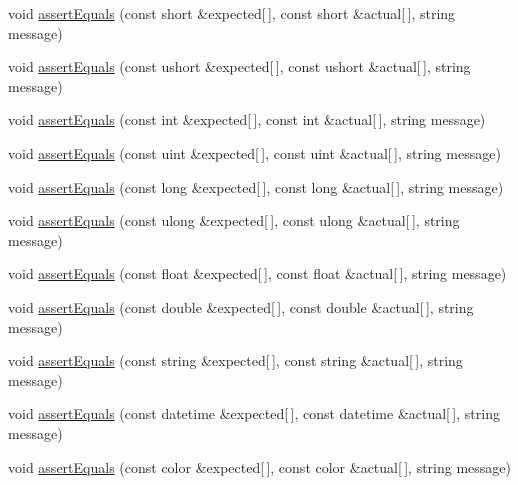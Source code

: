 \begin{DoxyCompactItemize}
\item 
void \mbox{\hyperlink{class_unit_test_ad7afd8e2f1a6b35eabf2671285776d7c}{assert\+Equals}} (const short \&expected\mbox{[}$\,$\mbox{]}, const short \&actual\mbox{[}$\,$\mbox{]}, string message)
\item 
void \mbox{\hyperlink{class_unit_test_a341a195925544c6cd97456fed137c6ee}{assert\+Equals}} (const ushort \&expected\mbox{[}$\,$\mbox{]}, const ushort \&actual\mbox{[}$\,$\mbox{]}, string message)
\item 
void \mbox{\hyperlink{class_unit_test_a9a9195df0ee30f3748513a4c7638120b}{assert\+Equals}} (const int \&expected\mbox{[}$\,$\mbox{]}, const int \&actual\mbox{[}$\,$\mbox{]}, string message)
\item 
void \mbox{\hyperlink{class_unit_test_a3b9131dd355b18a6c7f9be1bad520f6d}{assert\+Equals}} (const uint \&expected\mbox{[}$\,$\mbox{]}, const uint \&actual\mbox{[}$\,$\mbox{]}, string message)
\item 
void \mbox{\hyperlink{class_unit_test_a152eec7edfa6f9cd93143dbe5895b878}{assert\+Equals}} (const long \&expected\mbox{[}$\,$\mbox{]}, const long \&actual\mbox{[}$\,$\mbox{]}, string message)
\item 
void \mbox{\hyperlink{class_unit_test_ad87b2bc55a39171b20726481f273a618}{assert\+Equals}} (const ulong \&expected\mbox{[}$\,$\mbox{]}, const ulong \&actual\mbox{[}$\,$\mbox{]}, string message)
\item 
void \mbox{\hyperlink{class_unit_test_a602ed90782429bbec283f40c90386a1d}{assert\+Equals}} (const float \&expected\mbox{[}$\,$\mbox{]}, const float \&actual\mbox{[}$\,$\mbox{]}, string message)
\item 
void \mbox{\hyperlink{class_unit_test_a8a2372a3622d8b6a271c69ad1635df9f}{assert\+Equals}} (const double \&expected\mbox{[}$\,$\mbox{]}, const double \&actual\mbox{[}$\,$\mbox{]}, string message)
\item 
void \mbox{\hyperlink{class_unit_test_a1f7229215ccd9196d0f5837fc2f63757}{assert\+Equals}} (const string \&expected\mbox{[}$\,$\mbox{]}, const string \&actual\mbox{[}$\,$\mbox{]}, string message)
\item 
void \mbox{\hyperlink{class_unit_test_a2d5c3274f434977879697be4cf03dc70}{assert\+Equals}} (const datetime \&expected\mbox{[}$\,$\mbox{]}, const datetime \&actual\mbox{[}$\,$\mbox{]}, string message)
\item 
void \mbox{\hyperlink{class_unit_test_adabe969b121acfc3c1d6c1df584193c8}{assert\+Equals}} (const color \&expected\mbox{[}$\,$\mbox{]}, const color \&actual\mbox{[}$\,$\mbox{]}, string message)
\end{DoxyCompactItemize}


